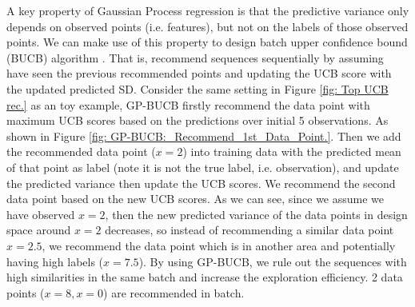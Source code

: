 A key property of Gaussian Process regression is that the predictive variance only depends on observed points (i.e. features), but not on the labels of those observed points. 
We can make use of this property to design batch upper confidence bound (BUCB) algorithm \cite{desautels2012parallelizing}.
That is, recommend sequences sequentially by assuming have seen the previous recommended points and updating the UCB score with the updated predicted SD. 
Consider the same setting in Figure \ref{fig: Top UCB rec.} as an toy example, GP-BUCB firstly recommend the data point with maximum UCB scores based on the predictions over initial 5 observations. 
As shown in Figure \ref{fig: GP-BUCB:_Recommend_1st_Data_Point.}.  
Then we add the recommended data point ($x = 2$) into training data with the predicted mean of that point as label (note it is not the true label, i.e. observation), and update the predicted variance then update the UCB scores. 
We recommend the second data point based on the new UCB scores.   
As we can see, since we assume we have observed $x = 2$, then the new predicted variance of the data points in design space around $x =2$  decreases, so instead of recommending a similar data point $x = 2.5$, we recommend the data point which is in another area and potentially having high labels ($x = 7.5$).     
By using GP-BUCB, we rule out the sequences with high similarities in the same batch and increase the exploration efficiency. 
2 data points ($x = 8, x = 0$) are recommended in batch. 

